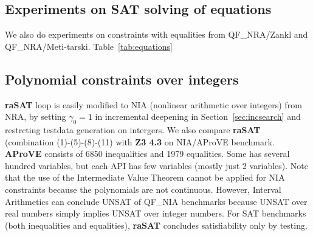 \documentclass[runningheads,a4paper,oribibl]{llncs}
\begin{document}
\subsection{Experiments on SAT solving of equations}
We also do experiments on constraints with equalities from QF\_NRA/Zankl and QF\_NRA/Meti-tarski. Table~\ref{tab:equations} 
\begin{table}[t]
\centering
{}
\medskip 
\caption{Comparison among SMT solvers over equalities} \label{tab:equations}
\end{table}

\subsection{Polynomial constraints over integers} \label{sec:NIA}

{\bf raSAT} loop is easily modified to NIA (nonlinear arithmetic over integers) from NRA, 
by setting $\gamma_0 = 1$ in incremental deepening in Section~\ref{sec:incsearch} 
and restrcting testdata generation on intergers. 
We also compare {\bf raSAT} (combination (1)-(5)-(8)-(11) with {\bf Z3 4.3} on NIA/AProVE benchmark. 
{\bf AProVE} consists of 6850 inequalities and 1979 equalities. 
Some has several hundred variables, but each API has few variables (mostly just 2 variables). Note that the use of the Intermediate Value Theorem cannot be applied for NIA constraints because the polynomials are not continuous. However, Interval Arithmetics can conclude UNSAT of QF\_NIA benchmarks because UNSAT over real numbers simply implies UNSAT over integer numbers. For SAT benchmarks (both inequalities and equalities), \textbf{raSAT} concludes satisfiability only by testing.
\end{document}
